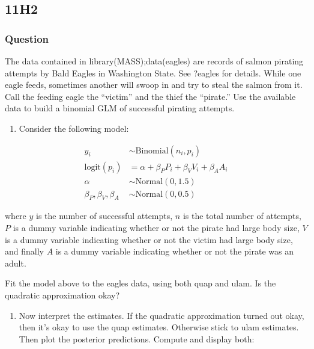 \documentclass[
]{book}
\providecommand{\tightlist}{%
  \setlength{\itemsep}{0pt}\setlength{\parskip}{0pt}}
\begin{document}
\hypertarget{h2-4}{%
\subsection*{11H2}\label{h2-4}}

\hypertarget{question-94}{%
\subsubsection*{Question}\label{question-94}}

The data contained in library(MASS);data(eagles) are records of salmon pirating attempts by Bald Eagles in Washington State. See ?eagles for details. While one eagle feeds, sometimes another will swoop in and try to steal the salmon from it. Call the feeding eagle the ``victim'' and the thief the ``pirate.'' Use the available data to build a binomial GLM of successful pirating attempts.

\begin{enumerate}
\def\labelenumi{(\alph{enumi})}
\tightlist
\item
  Consider the following model:
\end{enumerate}

\[
\begin{aligned}
y_i &\sim \text{Binomial}(n_i,p_i) \\
\text{logit}(p_i) &=  \alpha + \beta_P P_i + \beta_V V_i + \beta_A A_i \\
\alpha &\sim \text{Normal}(0,1.5) \\
\beta_P, \beta_V, \beta_A &\sim \text{Normal}(0,0.5) 
\end{aligned}
\]

where \(y\) is the number of successful attempts, \(n\) is the total number of attempts, \(P\) is a dummy variable indicating whether or not the pirate had large body size, \(V\) is a dummy variable indicating whether or not the victim had large body size, and finally \(A\) is a dummy variable indicating whether or not the pirate was an adult.

Fit the model above to the eagles data, using both quap and ulam. Is the quadratic approximation okay?

\begin{enumerate}
\def\labelenumi{(\alph{enumi})}
\setcounter{enumi}{1}
\tightlist
\item
  Now interpret the estimates. If the quadratic approximation turned out okay, then it's okay to use the quap estimates. Otherwise stick to ulam estimates. Then plot the posterior predictions. Compute and display both:
\end{enumerate}
\end{document}
